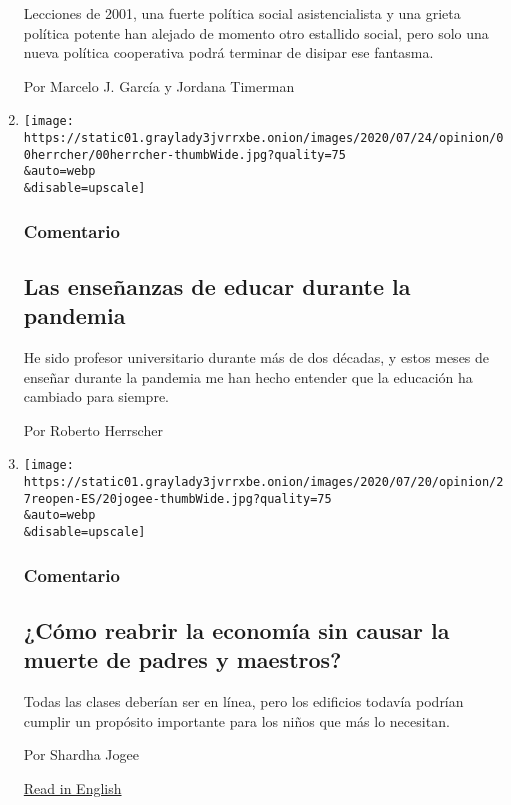 \begin{enumerate}
  Lecciones de 2001, una fuerte política social asistencialista y una
  grieta política potente han alejado de momento otro estallido social,
  pero solo una nueva política cooperativa podrá terminar de disipar ese
  fantasma.

  Por Marcelo J. García y Jordana Timerman
\item
  \href{/es/2020/07/27/espanol/opinion/clases-universidad-coronavirus.html}{}

  \texttt{[image: https://static01.graylady3jvrrxbe.onion/images/2020/07/24/opinion/00herrcher/00herrcher-thumbWide.jpg?quality=75\\\&auto=webp\\\&disable=upscale]}

  \hypertarget{comentario-11}{%
  \subsubsection{Comentario}\label{comentario-11}}

  \hypertarget{las-enseuxf1anzas-de-educar-durante-la-pandemia}{%
  \subsection{Las enseñanzas de educar durante la
  pandemia}\label{las-enseuxf1anzas-de-educar-durante-la-pandemia}}

  He sido profesor universitario durante más de dos décadas, y estos
  meses de enseñar durante la pandemia me han hecho entender que la
  educación ha cambiado para siempre.

  Por Roberto Herrscher
\item
  \href{/es/2020/07/27/espanol/opinion/reabrir-escuelas-riesgo-covid.html}{}

  \texttt{[image: https://static01.graylady3jvrrxbe.onion/images/2020/07/20/opinion/27reopen-ES/20jogee-thumbWide.jpg?quality=75\\\&auto=webp\\\&disable=upscale]}

  \hypertarget{comentario-12}{%
  \subsubsection{Comentario}\label{comentario-12}}

  \hypertarget{cuxf3mo-reabrir-la-economuxeda-sin-causar-la-muerte-de-padres-y-maestros}{%
  \subsection{¿Cómo reabrir la economía sin causar la muerte de padres y
  maestros?}\label{cuxf3mo-reabrir-la-economuxeda-sin-causar-la-muerte-de-padres-y-maestros}}

  Todas las clases deberían ser en línea, pero los edificios todavía
  podrían cumplir un propósito importante para los niños que más lo
  necesitan.

  Por Shardha Jogee

  \href{https://www.nytimes3xbfgragh.onion/2020/07/20/opinion/coronavirus-reopen-schools-economy.html}{Read
  in English}
\end{enumerate}

